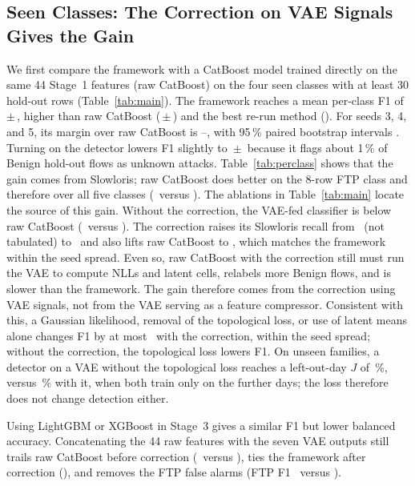 \documentclass[runningheads,a4paper]{llncs}
\newcommand{\pmsd}[2]{#1\,$\pm$\,#2}
\begin{document}
\subsection{Seen Classes: The Correction on VAE Signals Gives the Gain}

We first compare the framework with a CatBoost model trained directly on the same 44 Stage~1 features (raw CatBoost) on the four seen classes with at least 30 hold-out rows (Table~\ref{tab:main}). The framework reaches a mean per-class F1 of \pmsd{\OursMean}{\OursSd}, higher than raw CatBoost (\pmsd{\RawMean}{\RawSd}) and the best re-run method (\BestBaselineMean). For seeds 3, 4, and 5, its margin over raw CatBoost is \GainMin--\GainMax, with 95\,\% paired bootstrap intervals \BootstrapIntervals. Turning on the detector lowers F1 slightly to \pmsd{\DetectorMean}{\DetectorSd} because it flags about 1\,\% of Benign hold-out flows as unknown attacks. Table~\ref{tab:perclass} shows that the gain comes from Slowloris; raw CatBoost does better on the 8-row FTP class and therefore over all five classes (\AllClassRaw\ versus \AllClassOurs). The ablations in Table~\ref{tab:main} locate the source of this gain. Without the correction, the VAE-fed classifier is below raw CatBoost (\NoCorrMean\ versus \RawMean). The correction raises its Slowloris recall from \SlowRecallBase\ (not tabulated) to \SlowRecallCorr\ and also lifts raw CatBoost to \RawCorrMean, which matches the framework within the seed spread. Even so, raw CatBoost with the correction still must run the VAE to compute NLLs and latent cells, relabels more Benign flows, and is slower than the framework. The gain therefore comes from the correction using VAE signals, not from the VAE serving as a feature compressor. Consistent with this, a Gaussian likelihood, removal of the topological loss, or use of latent means alone changes F1 by at most \VaePartGap\ with the correction, within the seed spread; without the correction, the topological loss lowers F1. On unseen families, a detector on a VAE without the topological loss reaches a left-out-day $J$ of \JArmBase\,\%, versus \JArmTopology\,\% with it, when both train only on the further days; the loss therefore does not change detection either.

Using LightGBM or XGBoost in Stage~3 gives a similar F1 but lower balanced accuracy. Concatenating the 44 raw features with the seven VAE outputs still trails raw CatBoost before correction (\ConcatNoCorrMean\ versus \RawMean), ties the framework after correction (\ConcatMean), and removes the FTP false alarms (FTP F1 \ConcatFtpScore\ versus \OursFtpScore).
\end{document}
